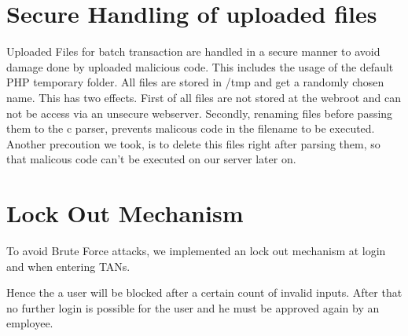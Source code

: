 \section{Secure Handling of uploaded files}
Uploaded Files for batch transaction are handled in a secure manner to avoid damage done by uploaded malicious code. This includes the usage of the default PHP temporary folder. All files are stored in /tmp and get a randomly chosen name. This has two effects. First of all files are not stored at the webroot and can not be access via an unsecure webserver. Secondly, renaming files before passing them to the c parser, prevents malicous code in the filename to be executed.
\newline
Another precoution we took, is to delete this files right after parsing them, so that malicous code can't be executed on our server later on. 

\section{Lock Out Mechanism}

To avoid Brute Force attacks, we implemented an lock out mechanism at login and when entering TANs.

Hence the a user will be blocked after a certain count of invalid inputs. After that no further login is possible for the user and he must be approved again by an employee.


